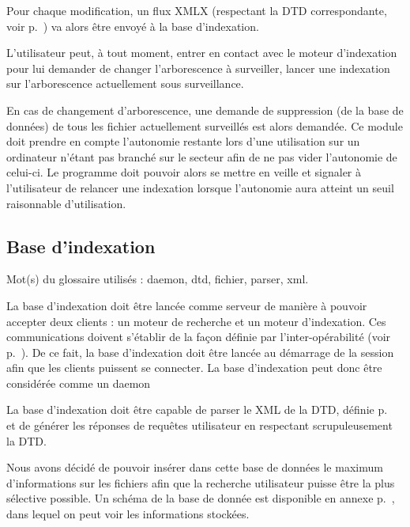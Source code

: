 \documentclass[a4paper,12pt]{report}
\begin{document}
Pour chaque modification, un flux XMLX (respectant la DTD correspondante, voir p.~\pageref{dtd_bi_mi}) va alors être envoyé à la base d'indexation.

L'utilisateur peut, à tout moment, entrer en contact avec le moteur d'indexation pour lui demander de changer l'arborescence à surveiller, lancer une indexation sur l'arborescence actuellement sous surveillance.

En cas de changement d'arborescence, une demande de suppression (de la base de données) de tous les fichier actuellement surveillés est alors demandée.
Ce module doit prendre en compte l'autonomie restante lors d'une utilisation sur un ordinateur n'étant pas branché sur le secteur afin de ne pas vider l'autonomie de celui-ci. Le programme doit pouvoir alors se mettre en veille et signaler à l'utilisateur de relancer une indexation lorsque l'autonomie aura atteint un seuil raisonnable d'utilisation.

\subsection{Base d'indexation}
Mot(s) du glossaire utilisés : \gls{daemon}, \gls{dtd}, \gls{fichier}, \gls{parser}, \gls{xml}.

La base d'indexation doit être lancée comme serveur de manière à pouvoir accepter deux clients : un moteur de recherche et un moteur d'indexation. Ces communications doivent s'établir de la façon définie par l'inter-opérabilité (voir p.~\pageref{inter_operabilite}). De ce fait, la base d'indexation doit être lancée au démarrage de la session afin que les clients puissent se connecter. La base d'indexation peut donc être considérée comme un daemon

La base d'indexation doit être capable de parser le XML de la DTD, définie p.~\pageref{dtd} et de générer les réponses de requêtes utilisateur en respectant scrupuleusement la DTD.

Nous avons décidé de pouvoir insérer dans cette base de données le maximum d'informations sur les fichiers afin que la recherche utilisateur puisse être la plus sélective possible. Un schéma de la base de donnée est disponible en annexe p.~\pageref{bdd}, dans lequel on peut voir les informations stockées.
\end{document}
